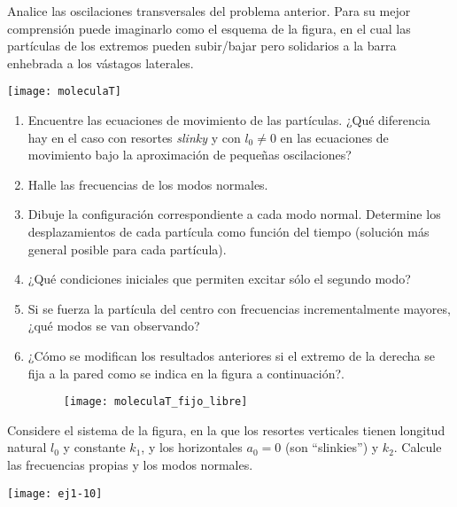 \item
\begin{minipage}[t][2.2cm]{0.5\textwidth}
Analice las oscilaciones transversales del problema anterior.
Para su mejor comprensión puede imaginarlo como el esquema de la figura, en el cual las partículas de los extremos pueden subir/bajar pero solidarios a la barra enhebrada a los vástagos laterales. 
\end{minipage}
\begin{minipage}[c][0cm][t]{0.45\textwidth}
  \texttt{[image: moleculaT]}
\end{minipage}
\begin{enumerate}
	\item Encuentre las ecuaciones de movimiento de las partículas.
	¿Qué diferencia hay en el caso con resortes \emph{slinky} y con $l_0 \neq 0$ en las ecuaciones de movimiento bajo la aproximación de pequeñas oscilaciones? 
	\item Halle las frecuencias de los modos normales.
	\item Dibuje la configuración correspondiente a cada modo normal.
Determine los desplazamientos de cada partícula como función del tiempo (solución más general posible para cada partícula).
	\item ¿Qué condiciones iniciales que permiten excitar sólo el segundo modo?
	\item Si se fuerza la partícula del centro con frecuencias incrementalmente mayores, ¿qué modos se van observando?
	\item ¿Cómo se modifican los resultados anteriores si el extremo de la derecha se fija a la pared como se indica en la figura a continuación?.
	\begin{figure}[h]
		\centering
		\texttt{[image: moleculaT\_fijo\_libre]}
	\end{figure} 
\end{enumerate}



\item
\begin{minipage}[t][1.2cm]{0.6\textwidth}
Considere el sistema de la figura, en la que los resortes verticales tienen longitud natural $l_0$ y constante $k_1$, y los horizontales $a_0= 0$ (son ``slinkies'') y $k_2$.
Calcule las frecuencias propias y los modos normales. 
\end{minipage}
\begin{minipage}[c][1.2cm][t]{0.35\textwidth}
  \texttt{[image: ej1-10]}
\end{minipage}
